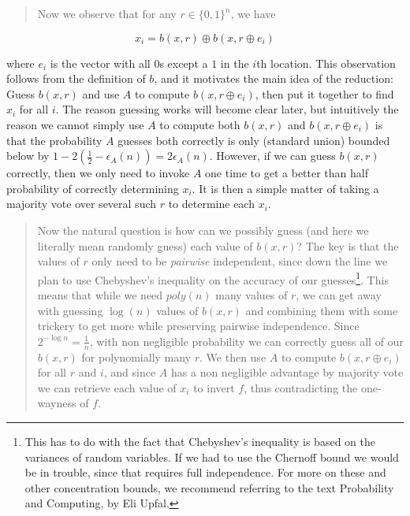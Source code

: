 \begin{quote}
Now we observe that for any \(r \in \{0, 1\}^n\), we have
\end{quote}

\[x_i = b(x, r) \oplus b(x, r \oplus e_i)\]

where \(e_i\) is the vector with all \(0\)s except a \(1\) in the
\(i\)th location. This observation follows from the definition of \(b\),
and it motivates the main idea of the reduction: Guess \(b(x, r)\) and
use \(A\) to compute \(b(x, r \oplus e_i)\), then put it together to
find \(x_i\) for all \(i\). The reason guessing works will become clear
later, but intuitively the reason we cannot simply use \(A\) to compute
both \(b(x, r)\) and \(b(x, r \oplus e_i)\) is that the probability
\(A\) guesses both correctly is only (standard union) bounded below by
\(1 - 2 \left( \tfrac{1}{2} - \epsilon_A(n)\right) = 2\epsilon_A(n)\).
However, if we can guess \(b(x, r)\) correctly, then we only need to
invoke \(A\) one time to get a better than half probability of correctly
determining \(x_i\). It is then a simple matter of taking a majority
vote over several such \(r\) to determine each \(x_i\).

\begin{quote}
Now the natural question is how can we possibly guess (and here we
literally mean randomly guess) each value of \(b(x, r)\)? The key is
that the values of \(r\) only need to be \emph{pairwise} independent,
since down the line we plan to use Chebyshev's inequality on the
accuracy of our guesses\footnote{This has to do with the fact that
  Chebyshev's inequality is based on the variances of random variables.
  If we had to use the Chernoff bound we would be in trouble, since that
  requires full independence. For more on these and other concentration
  bounds, we recommend referring to the text Probability and Computing,
  by Eli Upfal.}. This means that while we need \(poly(n)\) many values
of \(r\), we can get away with guessing \(\log (n)\) values of
\(b(x, r)\) and combining them with some trickery to get more while
preserving pairwise independence. Since \(2^{-\log n} = \tfrac{1}{n}\),
with non negligible probability we can correctly guess all of our
\(b(x, r)\) for polynomially many \(r\). We then use \(A\) to compute
\(b(x, r \oplus e_i)\) for all \(r\) and \(i\), and since \(A\) has a
non negligible advantage by majority vote we can retrieve each value of
\(x_i\) to invert \(f\), thus contradicting the one-wayness of \(f\).
\end{quote}

